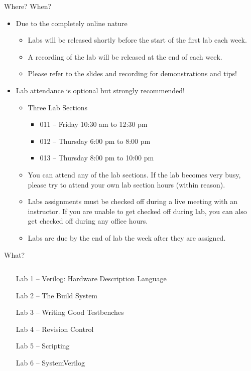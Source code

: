 \documentclass[table,dvipsnames,colorlinks=true]{beamer}
\begin{document}
\begin{frame}{Where? When?}
    \begin{itemize}        
    \item Due to the completely online nature
        \begin{itemize}
            \item Labs will be released shortly before the start of the first lab each week.
            \item A recording of the lab will be released at the end of each week.
            \item Please refer to the slides and recording for demonstrations and tips!
            \end{itemize}
    \item Lab attendance is optional but strongly recommended!
        \begin{itemize}
            \item Three Lab Sections
                \begin{itemize}
                    \item 011 -- Friday 10:30 am to 12:30 pm
                    \item 012 -- Thursday 6:00 pm to 8:00 pm
                    \item 013 -- Thursday 8:00 pm to 10:00 pm 
                \end{itemize}
            \item You can attend any of the lab sections. If the lab becomes very busy, please try to attend your own lab section hours (within reason). 
            \item Labs assignments must be checked off during a live meeting with an instructor. If you are unable to get checked off during lab, you can also get checked off during any office hours.
            \item Labs are due by the end of lab the week after they are assigned.
            \end{itemize}
    \end{itemize}
\end{frame}

\begin{frame}{What?}
    \begin{columns}
        \begin{column}[c]{0.8\textwidth}
            \begin{itemize}
                \item[Lab 1 --] Verilog: Hardware Description Language
                \item[Lab 2 --] The Build System
                \item[Lab 3 --] Writing Good Testbenches
                \item[Lab 4 --] Revision Control
                \item[Lab 5 --] Scripting
                \item[Lab 6 --] SystemVerilog
            \end{itemize}
        \end{column}
    \end{columns}
\end{frame}
\end{document}
